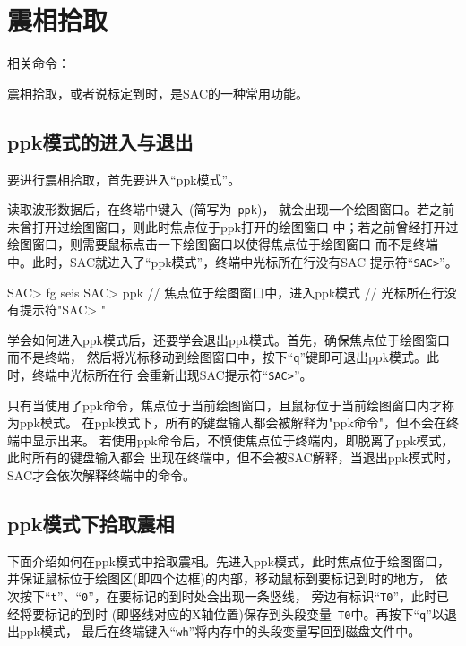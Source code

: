 \section{震相拾取}
\label{sec:phase-picking}
相关命令：

震相拾取，或者说标定到时，是SAC的一种常用功能。

\subsection{ppk模式的进入与退出}
要进行震相拾取，首先要进入``ppk模式''。

读取波形数据后，在终端中键入~(简写为~\verb+ppk+)，
就会出现一个绘图窗口。若之前未曾打开过绘图窗口，则此时焦点位于ppk打开的绘图窗口
中；若之前曾经打开过绘图窗口，则需要鼠标点击一下绘图窗口以使得焦点位于绘图窗口
而不是终端中。此时，SAC就进入了``ppk模式''，终端中光标所在行没有SAC
提示符``\verb+SAC>+''。

\begin{SACCode}
SAC> fg seis
SAC> ppk    // 焦点位于绘图窗口中，进入ppk模式
            // 光标所在行没有提示符"SAC> "
\end{SACCode}

学会如何进入ppk模式后，还要学会退出ppk模式。首先，确保焦点位于绘图窗口而不是终端，
然后将光标移动到绘图窗口中，按下``\verb+q+''键即可退出ppk模式。此时，终端中光标所在行
会重新出现SAC提示符``\verb+SAC>+''。

\begin{note}
只有当使用了ppk命令，焦点位于当前绘图窗口，且鼠标位于当前绘图窗口内才称为ppk模式。
在ppk模式下，所有的键盘输入都会被解释为"ppk命令"，但不会在终端中显示出来。
若使用ppk命令后，不慎使焦点位于终端内，即脱离了ppk模式，此时所有的键盘输入都会
出现在终端中，但不会被SAC解释，当退出ppk模式时，SAC才会依次解释终端中的命令。
\end{note}

\subsection{ppk模式下拾取震相}
下面介绍如何在ppk模式中拾取震相。先进入ppk模式，此时焦点位于绘图窗口，
并保证鼠标位于绘图区(即四个边框)的内部，移动鼠标到要标记到时的地方，
依次按下``\verb+t+''、``\verb+0+''，在要标记的到时处会出现一条竖线，
旁边有标识``\verb+T0+''，此时已经将要标记的到时
(即竖线对应的X轴位置)保存到头段变量~\verb+T0+中。再按下``\verb+q+''以退出ppk模式，
最后在终端键入``\verb+wh+''将内存中的头段变量写回到磁盘文件中。

